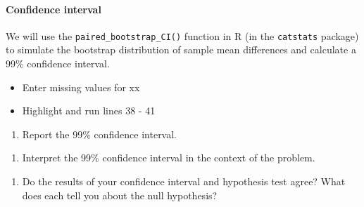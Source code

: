\documentclass[
]{report}
\newenvironment{Shaded}{\begin{snugshade}}{\end{snugshade}}
\newcommand{\AttributeTok}[1]{\textcolor[rgb]{0.13,0.29,0.53}{#1}}
\newcommand{\CommentTok}[1]{\textcolor[rgb]{0.56,0.35,0.01}{\textit{#1}}}
\newcommand{\DecValTok}[1]{\textcolor[rgb]{0.00,0.00,0.81}{#1}}
\newcommand{\FunctionTok}[1]{\textcolor[rgb]{0.13,0.29,0.53}{\textbf{#1}}}
\newcommand{\NormalTok}[1]{#1}
\newcommand{\SpecialCharTok}[1]{\textcolor[rgb]{0.81,0.36,0.00}{\textbf{#1}}}
\providecommand{\tightlist}{%
  \setlength{\itemsep}{0pt}\setlength{\parskip}{0pt}}
\begin{document}
\paragraph*{Confidence interval}\label{confidence-interval-1}

We will use the \texttt{paired\_bootstrap\_CI()} function in R (in the \texttt{catstats} package) to simulate the bootstrap distribution of sample mean differences and calculate a 99\% confidence interval.

\begin{itemize}
\item
  Enter missing values for xx
\item
  Highlight and run lines 38 - 41
\end{itemize}

\begin{Shaded}
\end{Shaded}

\begin{enumerate}
\def\labelenumi{\arabic{enumi}.}
\setcounter{enumi}{7}
\tightlist
\item
  Report the 99\% confidence interval.
\end{enumerate}

\vspace{0.2in}

\begin{enumerate}
\def\labelenumi{\arabic{enumi}.}
\setcounter{enumi}{8}
\tightlist
\item
  Interpret the 99\% confidence interval in the context of the problem.
\end{enumerate}

\vspace{0.7in}

\begin{enumerate}
\def\labelenumi{\arabic{enumi}.}
\setcounter{enumi}{9}
\tightlist
\item
  Do the results of your confidence interval and hypothesis test agree? What does each tell you about the null hypothesis?
\end{enumerate}
\end{document}
